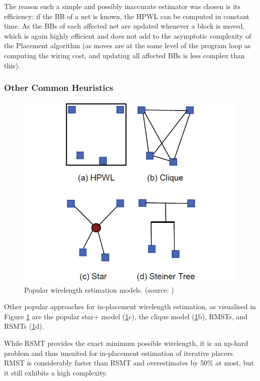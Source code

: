 The reason such a simple and possibly inaccurate estimator was chosen is its efficiency: if the \gls{BB} of a net is known, the \gls{HPWL} can be computed in constant time. As the \glspl{BB} of each affected net are updated whenever a block is moved, which is again highly efficient and does not add to the asymptotic complexity of the Placement algorithm (as moves are at the same level of the program loop as computing the wiring cost, and updating all affected \glspl{BB} is less complex than this).

\subsubsection{Other Common Heuristics}

\begin{figure}
	\includegraphics[width=\textwidth]{plots/wirelength-estimation-models.png}
	\caption{Popular wirelength estimation models. (source: \cite{star-plus-paper})}
	\label{fig:wirelength-estimation-models}
\end{figure}

Other popular approaches for in-placement wirelength estimation, as visualised in Figure \ref{fig:wirelength-estimation-models} are the popular star+ model (\ref{fig:wirelength-estimation-models}c), the clique model (\ref{fig:wirelength-estimation-models}b), \glspl{RMST}, and \glspl{RSMT} (\ref{fig:wirelength-estimation-models}d)\cite{star-plus-paper}.

While \gls{RSMT} provides the exact minimum possible wirelength, it is an np-hard problem and thus unsuited for in-placement estimation of iterative placers. \gls{RMST} is considerably faster than \gls{RSMT} and overestimates by 50\% at most\cite{rmst-quality}, but it still exhibits a high complexity.

